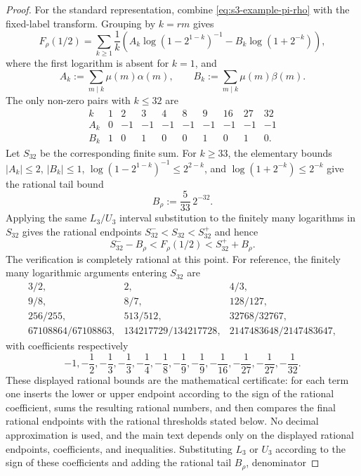 \documentclass[11pt,a4paper]{amsart}
\theoremstyle{plain}
\theoremstyle{definition}
\theoremstyle{remark}
\newcommand{\abs}[1]{\lvert #1 \rvert}
\begin{document}
\begin{proof}
  For the standard representation, combine
  \eqref{eq:s3-example-pi-rho} with the fixed-label transform. Grouping by
  \(k=rm\) gives
  \[
    F_\rho(1/2)=
    \sum_{k\ge1}\frac{1}{k}
      \left(
        A_k\log(1-2^{1-k})^{-1}
        -B_k\log(1+2^{-k})
      \right),
  \]
  where the first logarithm is absent for \(k=1\), and
  \[
    A_k:=\sum_{m\mid k}\mu(m)\alpha(m),
    \qquad
    B_k:=\sum_{m\mid k}\mu(m)\beta(m).
  \]
  The only non-zero pairs with \(k\le32\) are
  \[
  \begin{array}{c|ccccccccc}
    k&1&2&3&4&8&9&16&27&32\\ \hline
    A_k&0&-1&-1&-1&-1&-1&-1&-1&-1\\
    B_k&1&0&1&0&0&1&0&1&0.
  \end{array}
  \]
  Let \(S_{32}\) be the corresponding finite sum. For \(k\ge33\), the
  elementary bounds \(\abs{A_k}\le2\), \(\abs{B_k}\le1\),
  \(\log(1-2^{1-k})^{-1}\le2^{2-k}\), and
  \(\log(1+2^{-k})\le2^{-k}\) give the rational tail bound
  \[
    B_\rho:=\frac{5}{33}\,2^{-32}.
  \]
  Applying the same \(L_3/U_3\) interval substitution to the finitely many
  logarithms in \(S_{32}\) gives the rational endpoints
  \(S_{32}^-<S_{32}<S_{32}^+\)
  and hence
  \[
    S_{32}^- -B_\rho < F_\rho(1/2)<S_{32}^+ +B_\rho.
  \]
  The verification is completely rational at this point.  For reference,
  the finitely many logarithmic arguments entering \(S_{32}\) are
  \[
  \begin{array}{ccc}
    3/2, & 2, & 4/3,\\
    9/8, & 8/7, & 128/127,\\
    256/255, & 513/512, & 32768/32767,\\
    67108864/67108863, & 134217729/134217728, &
    2147483648/2147483647,
  \end{array}
  \]
  with coefficients respectively
  \[
    -1,
    -\frac12,
    -\frac13,
    -\frac13,
    -\frac14,
    -\frac18,
    -\frac19,
    -\frac19,
    -\frac1{16},
    -\frac1{27},
    -\frac1{27},
    -\frac1{32}.
  \]
  These displayed rational bounds are the mathematical certificate: for
  each term one inserts the lower or upper endpoint according to the sign of
  the rational coefficient, sums the resulting rational numbers, and then
  compares the final rational endpoints with the rational thresholds stated
  below.  No decimal approximation is used, and the main text depends only on
  the displayed rational endpoints, coefficients, and inequalities.
  Substituting \(L_3\) or \(U_3\) according to the sign of these
  coefficients and adding the rational tail \(B_\rho\), denominator

\end{proof}
\end{document}
